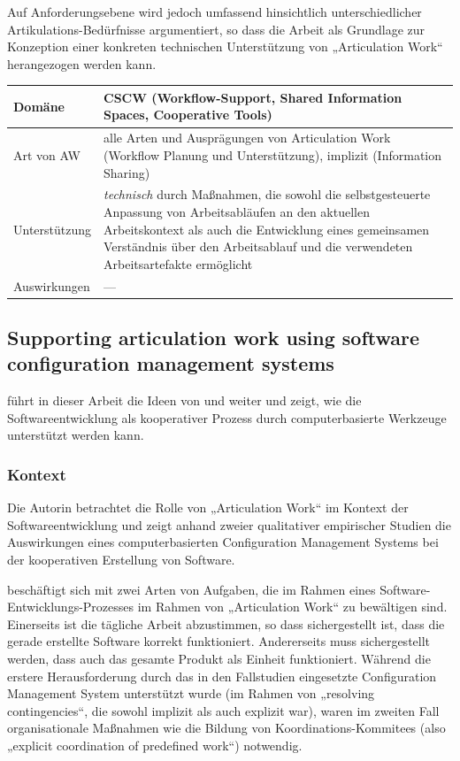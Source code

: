 Auf Anforderungsebene wird jedoch umfassend hinsichtlich unterschiedlicher Artikulations-Bedürfnisse argumentiert, so dass die Arbeit als Grundlage zur Konzeption einer konkreten technischen Unterstützung von „Articulation Work“ herangezogen werden kann.
\\[1em]
\begin{tabular}{| p{3cm} | p{10cm} |}
  \hline
  Domäne & \gls{CSCW} (Workflow-Support, Shared Information Spaces, Cooperative Tools)\\ \hline
  Art von AW & alle Arten und Ausprägungen von Articulation Work (Workflow Planung und Unterstützung), implizit (Information Sharing)\\ \hline
  Unterstützung & \emph{technisch} durch Maßnahmen, die sowohl die selbstgesteuerte Anpassung von Arbeitsabläufen an den aktuellen Arbeitskontext als auch die Entwicklung eines gemeinsamen Verständnis über den Arbeitsablauf und die verwendeten Arbeitsartefakte ermöglicht \\ \hline
  Auswirkungen & --- \\ \hline
\end{tabular}

\subsection{Supporting articulation work using software configuration management systems}

\citet{Grinter96} führt in dieser Arbeit die Ideen von \citet{Bendifallah87} und \citet{Schmidt92} weiter und zeigt, wie die Softwareentwicklung als kooperativer Prozess durch computerbasierte Werkzeuge unterstützt werden kann.

\subsubsection{Kontext}

Die Autorin betrachtet die Rolle von „Articulation Work“ im Kontext der Softwareentwicklung und zeigt anhand zweier qualitativer empirischer Studien die Auswirkungen eines computerbasierten Configuration Management Systems bei der kooperativen Erstellung von Software. 

\citeauthor{Grinter96} beschäftigt sich mit zwei Arten von Aufgaben, die im Rahmen eines Software-Entwicklungs-Prozesses im Rahmen von „Articulation Work“ zu bewältigen sind. Einerseits ist die tägliche Arbeit abzustimmen, so dass sichergestellt ist, dass die gerade erstellte Software korrekt funktioniert. Andererseits muss sichergestellt werden, dass auch das gesamte Produkt als Einheit funktioniert. Während die erstere Herausforderung durch das in den Fallstudien eingesetzte Configuration Management System unterstützt wurde (im Rahmen von „resolving contingencies“, die sowohl implizit als auch explizit war), waren im zweiten Fall organisationale Maßnahmen wie die Bildung von Koordinations-Kommitees (also „explicit coordination of predefined work“) notwendig. 

